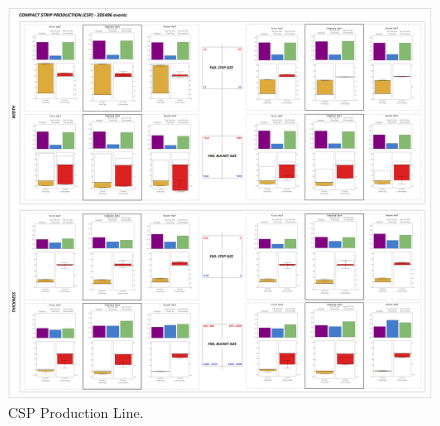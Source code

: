 \begin{landscape}
	\begin{figure}[ht]
		\centering
		\includegraphics[width=1.1\textwidth]{../images/supplements-CSP_real_life_events_analysis-results.png}
		\caption{CSP Production Line.}
		\label{figure-supplements-CSP}
	\end{figure}
\end{landscape}